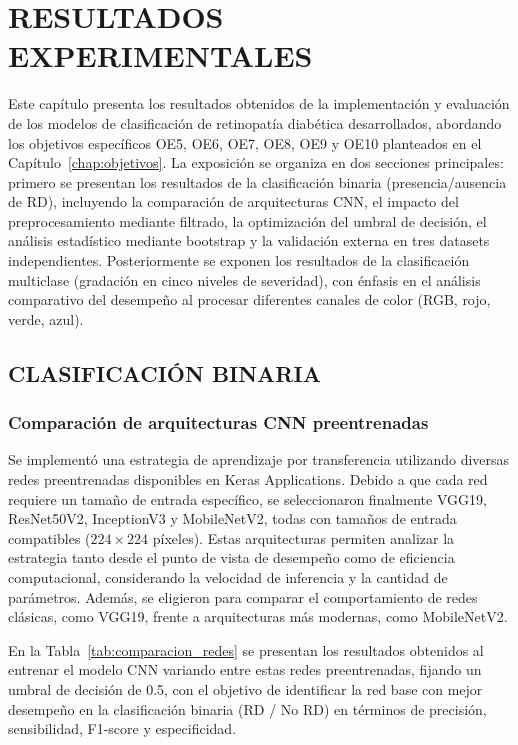 \chapter{RESULTADOS EXPERIMENTALES} \label{chap:resultados}

Este capítulo presenta los resultados obtenidos de la implementación y evaluación de los 
modelos de clasificación de retinopatía diabética desarrollados, abordando los objetivos 
específicos OE5, OE6, OE7, OE8, OE9 y OE10 planteados en el 
Capítulo~\ref{chap:objetivos}. La exposición se organiza en dos secciones principales: 
primero se presentan los resultados de la clasificación binaria (presencia/ausencia de 
RD), incluyendo la comparación de arquitecturas CNN, el impacto del preprocesamiento 
mediante filtrado, la optimización del umbral de decisión, el análisis estadístico 
mediante bootstrap y la validación externa en tres datasets independientes. 
Posteriormente se exponen los resultados de la clasificación multiclase (gradación en 
cinco niveles de severidad), con énfasis en el análisis comparativo del desempeño al 
procesar diferentes canales de color (RGB, rojo, verde, azul).

\section{CLASIFICACIÓN BINARIA}

\subsection{Comparación de arquitecturas CNN preentrenadas}

Se implementó una estrategia de aprendizaje por transferencia utilizando diversas redes 
preentrenadas disponibles en Keras Applications. Debido a que cada red requiere un tamaño 
de entrada específico, se seleccionaron finalmente VGG19, ResNet50V2, InceptionV3 y 
MobileNetV2, todas con tamaños de entrada compatibles ($224 \times 224$ píxeles). Estas 
arquitecturas permiten analizar la estrategia tanto desde el punto de vista de desempeño 
como de eficiencia computacional, considerando la velocidad de inferencia y la cantidad 
de parámetros. Además, se eligieron para comparar el comportamiento de redes clásicas, 
como VGG19, frente a arquitecturas más modernas, como MobileNetV2.

En la Tabla~\ref{tab:comparacion_redes} se presentan los resultados obtenidos al entrenar 
el modelo CNN variando entre estas redes preentrenadas, fijando un umbral de decisión de 
0.5, con el objetivo de identificar la red base con mejor desempeño en la clasificación 
binaria (RD / No RD) en términos de precisión, sensibilidad, F1-score y especificidad.

